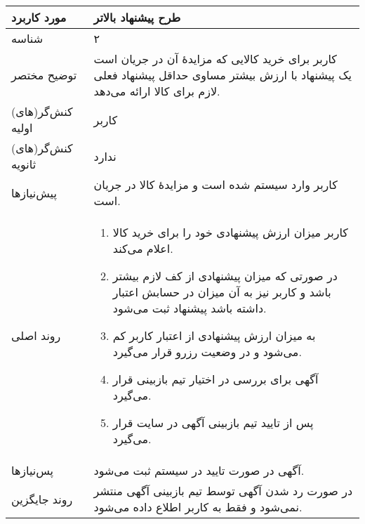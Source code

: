 \documentclass{article}
\begin{document}
\begin{center}
\bgroup
\def\arraystretch{1.5}
\begin{tabular} {|p{}|p{}|}
\hline
 مورد کاربرد & 
طرح پیشنهاد بالاتر
\\ \hline
 شناسه &
۲
\\ \hline
توضیح مختصر &
کاربر برای خرید کالایی که مزایدهٔ آن در جریان است یک پیشنهاد با ارزش بیشتر مساوی حداقل پیشنهاد فعلی لازم برای کالا ارائه می‌دهد.
\\ \hline
کنش‌گر(های) اولیه &
کاربر
\\ \hline
کنش‌گر(های) ثانویه &
ندارد
\\ \hline
پیش‌نیازها &
کاربر وارد سیستم شده است و مزایدهٔ کالا در جریان است.
\\ \hline
روند اصلی &
\begin{enumerate}
\item
کاربر میزان ارزش پیشنهادی خود را برای خرید کالا اعلام می‌کند.
\item
در صورتی که میزان پیشنهادی از کف لازم بیشتر باشد و کاربر نیز به آن میزان در حسابش اعتبار داشته باشد پیشنهاد ثبت می‌شود.
\item
به میزان ارزش پیشنهادی از اعتبار کاربر کم می‌شود و در وضعیت رزرو قرار می‌گیرد.
\item
آگهی برای بررسی در اختیار تیم بازبینی قرار می‌گیرد.
\item
پس از تایید تیم بازبینی آگهی در سایت قرار می‌گیرد.
\end{enumerate}
\\ \hline
پس‌نیازها &
آگهی در صورت تایید در سیستم ثبت می‌شود.
\\ \hline
روند جایگزین &
در صورت رد شدن آگهی توسط تیم بازبینی آگهی منتشر نمی‌شود و فقط به کاربر اطلاع داده می‌شود. 
\\ \hline
\end{tabular}
\egroup
\end{center}

\newpage
\end{document}
